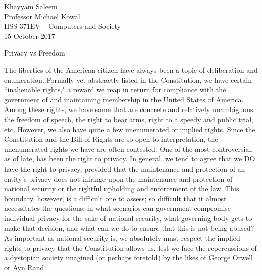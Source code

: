 \documentclass[12pt]{article}
\begin{document}
\begin{flushleft}
    Khayyam Saleem\\
    Professor Michael Kowal\\
    HSS 371EV -- Computers and Society\\
    15 October 2017\\
\begin{center}Privacy vs Freedom\end{center}
    \setlength{\parindent}{0.5in}
    \par The liberties of the American citizen have always been a topic of
    deliberation and enumeration. Formally yet abstractly listed in the
    Constitution, we have certain ``inalienable rights," a reward we reap in
    return for compliance with the government of and maintaining membership in
    the United States of America. Among these rights, we have some that are
    concrete and relatively unambiguous: the freedom of speech, the right to 
    bear arms, right to a speedy and public trial, etc. However, we also have 
    quite a few unenumerated or implied rights. Since the Constitution and the 
    Bill of Rights are so open to interpretation, the unenumerated rights we 
    have are often contested. One of the most controversial, as of late, has 
    been the right to privacy. In general, we tend to agree that we DO have the 
    right to privacy, provided that the maintenance and protection of an 
    entity's privacy does not infringe upon the maintenance and protection of 
    national security or the rightful upholding and enforcement of the law. This 
    boundary, however, is a difficult one to assess; so difficult that it almost 
    necessitates the questions: in what scenarios can government compromise 
    individual privacy for the sake of national security, what governing body 
    gets to make that decision, and what can we do to ensure that this is not 
    being abused? As important as national security is, we absolutely must 
    respect the implied rights to privacy that the Constitution allows us, lest 
    we face the repercussions of a dystopian society imagined (or perhaps 
    foretold) by the likes of George Orwell or Ayn Rand.


\end{flushleft}
\end{document}
